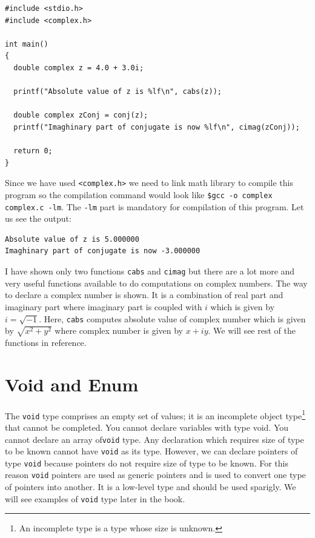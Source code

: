\begin{Verbatim}[frame=single]
#include <stdio.h>
#include <complex.h>

int main()
{
  double complex z = 4.0 + 3.0i;

  printf("Absolute value of z is %lf\n", cabs(z));

  double complex zConj = conj(z);
  printf("Imaghinary part of conjugate is now %lf\n", cimag(zConj));

  return 0;
}
\end{Verbatim}

Since we have used \texttt{<complex.h>} we need to link math library to compile
this program so the compilation command would look like \texttt{\$gcc -o complex
complex.c -lm}. The \texttt{-lm} part is mandatory for compilation of this
program. Let us see the output:

\begin{Verbatim}[frame=single]
Absolute value of z is 5.000000
Imaghinary part of conjugate is now -3.000000
\end{Verbatim}

I have shown only two functions \texttt{cabs} and \texttt{cimag} but there are
a lot more and very useful functions available to do computations on complex
numbers. The way to declare a complex number is shown. It is a combination of
real part and imaginary part where imaginary part is coupled with $i$ which is
given by $i = \sqrt{-1}$. Here, \texttt{cabs} computes absolute value of
complex number which is given by $\sqrt{x^2 + y^2}$ where complex number is
given by $x + iy$. We will see rest of the functions in reference.

\section{Void and Enum}
The \texttt{void} type comprises an empty set of values; it is an incomplete
object type\footnote{An incomplete type is a type whose size is unknown.} that
cannot be completed. You cannot declare variables with type void. You cannot
declare an array of\texttt{void} type. Any declaration which requires size of
type to be known cannot have \texttt{void} as its type. However, we can declare
pointers of type \texttt{void} because pointers do not require size of type to
be known. For this reason \texttt{void} pointers are used as generic pointers
and is used to convert one type of pointers into another. It is a low-level
type and should be used sparigly. We will see examples of \texttt{void} type
later in the book.

